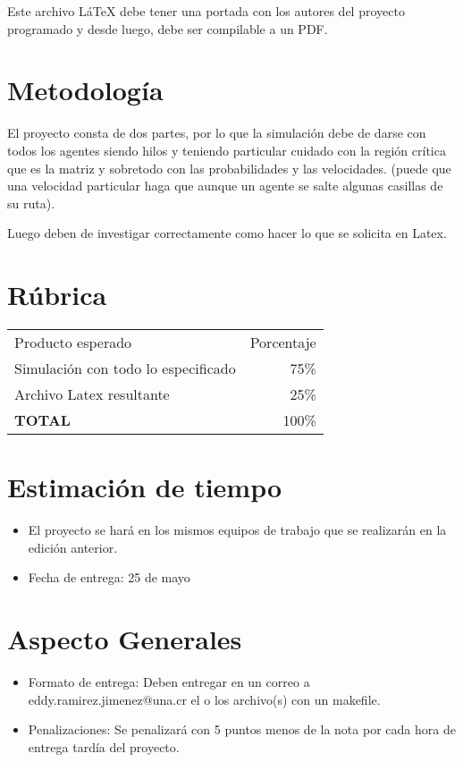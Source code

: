 \documentclass[11pt]{article}
\begin{document}
Este archivo LáTeX debe tener una portada con los autores del proyecto programado y desde luego, debe ser compilable a un PDF.


\section{Metodología}

El proyecto consta de dos partes, por lo que la simulación debe de darse con todos los agentes siendo hilos y teniendo particular cuidado con la región crítica que es la matriz y sobretodo con las probabilidades y las velocidades. (puede que una velocidad particular haga que aunque un agente se salte algunas casillas de su ruta).

Luego deben de investigar correctamente como hacer lo que se solicita en Latex. 

\section{Rúbrica}

\begin{tabular}{|lr|}
\hline
	Producto esperado & Porcentaje\\
	Simulación con todo lo especificado & 75\%\\
	Archivo Latex resultante & 25\%\\
	\textbf{TOTAL} & 100\%\\
\hline
\end{tabular}

\section{Estimación de tiempo}
\begin{itemize}
\item El proyecto se hará en los mismos equipos de trabajo que se realizarán en la edición anterior. 
\item Fecha de entrega: 25 de mayo
\end{itemize}

\section{Aspecto Generales}
\begin{itemize}
\item Formato de entrega: Deben entregar en un correo a eddy.ramirez.jimenez@una.cr el o los archivo(s) con un makefile.
\item Penalizaciones: Se penalizará con 5 puntos menos de la nota por cada hora de entrega tardía del proyecto.
\end{itemize}
\end{document}
